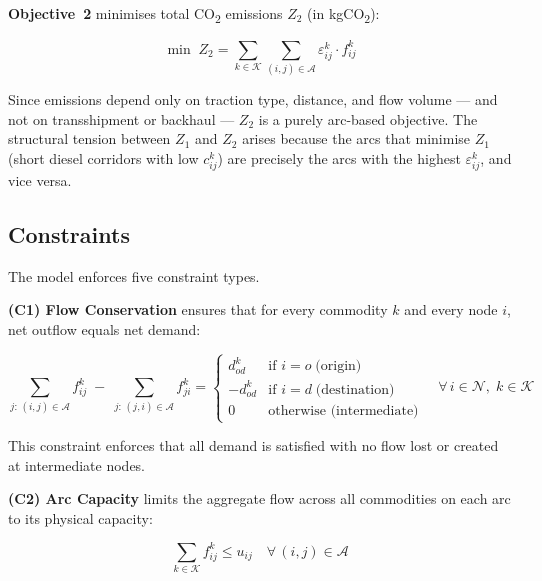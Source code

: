 \documentclass[11pt, a4paper]{article}
\numberwithin{equation}{section}
\numberwithin{figure}{section}
\numberwithin{table}{section}
\begin{document}
\textbf{Objective~2} minimises total CO\textsubscript{2} emissions $Z_2$ (in
kgCO\textsubscript{2}):

\begin{equation}
    \min\; Z_2 = \sum_{k \in \mathcal{K}} \sum_{(i,j) \in \mathcal{A}}
    \varepsilon^k_{ij} \cdot f^k_{ij}
    \label{eq:Z2}
\end{equation}

Since emissions depend only on traction type, distance, and flow volume — and not on
transshipment or backhaul — $Z_2$ is a purely arc-based objective. The structural
tension between $Z_1$ and $Z_2$ arises because the arcs that minimise $Z_1$ (short
diesel corridors with low $c^k_{ij}$) are precisely the arcs with the highest
$\varepsilon^k_{ij}$, and vice versa.

\subsection{Constraints}

The model enforces five constraint types.

\textbf{(C1) Flow Conservation} ensures that for every commodity $k$ and every node
$i$, net outflow equals net demand:

\begin{equation}
    \sum_{j:\,(i,j)\in\mathcal{A}} f^k_{ij} \;-\;
    \sum_{j:\,(j,i)\in\mathcal{A}} f^k_{ji}
    = \begin{cases}
        d^k_{od} & \text{if } i = o \;\text{(origin)} \\
        -d^k_{od} & \text{if } i = d \;\text{(destination)} \\
        0 & \text{otherwise (intermediate)}
    \end{cases}
    \quad \forall\, i \in \mathcal{N},\; k \in \mathcal{K}
    \label{eq:conservation}
\end{equation}

This constraint enforces that all demand is satisfied with no flow lost or created
at intermediate nodes. 

\textbf{(C2) Arc Capacity} limits the aggregate flow across all commodities on each arc
to its physical capacity:

\begin{equation}
    \sum_{k \in \mathcal{K}} f^k_{ij} \leq u_{ij}
    \quad \forall\, (i,j) \in \mathcal{A}
    \label{eq:capacity}
\end{equation}
\end{document}
